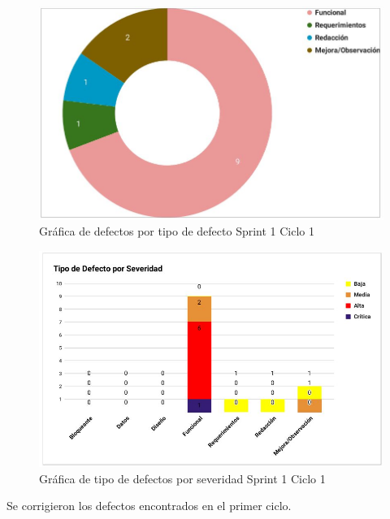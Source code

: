 \begin{figure}[H]
	\begin{center}
		\includegraphics[width=.75\textwidth]{images/pruebas/s1c1-2}
		\caption{Gráfica de defectos por tipo de defecto Sprint 1 Ciclo 1}
		\label{fig:infos1c1-2}
	\end{center}
\end{figure}

\newpage

\begin{figure}[H]
	\begin{center}
		\includegraphics[width=.95\textwidth]{images/pruebas/s1c1-3}
		\caption{Gráfica de tipo de defectos por severidad Sprint 1 Ciclo 1}
		\label{fig:infos1c1-3}
	\end{center}
\end{figure}

Se corrigieron los defectos encontrados en el primer ciclo.
